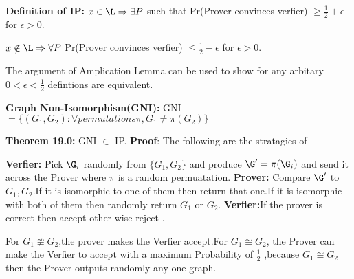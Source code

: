 \textbf {Definition of IP:}
\newline $ x \in \L  \Rightarrow \exists P $ such that Pr(Prover convinces verfier) $ \geq \frac{1}{2}+\epsilon $ for $ \epsilon >0$.

 $ x \notin \L  \Rightarrow \forall P$  Pr(Prover convinces verfier)  $\leq \frac{1}{2}-\epsilon $ for $ \epsilon >0$.

The  argument of Amplication Lemma can be used to show for any arbitary $0<\epsilon<\frac{1}{2}$ defintions are equivalent.

 \textbf {Graph Non-Isomorphism(GNI):}
\newline GNI$= \{(G_{1},G_{2}):\forall permutations \pi ,G_{1}\neq \pi(G_{2})\}$

 \textbf {Theorem 19.0:}  GNI $\in $ IP.
\newline \textbf{Proof}: The following are the stratagies of 

 \textbf{Verfier:} Pick $\G_{i}$ randomly from $\{G_{1},G_{2}\}$ and produce $\G^\prime =\pi(\G_{i})$ and send it across the Prover where $\pi$ is a random permuatation.
\newline \textbf{Prover:} Compare $\G^\prime$ to $G_{1},G_{2}$.If it is isomorphic to one of them then return that one.If it is isomorphic with both of them then randomly return $G_{1}$ or $G_{2}$.
\newline \textbf{Verfier:}If the prover is correct then accept other wise reject .

 For $G_{1}\ncong G_{2}$,the prover makes the Verfier accept.For $G_{1}\cong G_{2}$, the Prover can make the Verfier to accept with a maximum Probability of $\frac{1}{2}$ ,because $G_{1}\cong G_{2}$ then the Prover outputs randomly any one graph.


